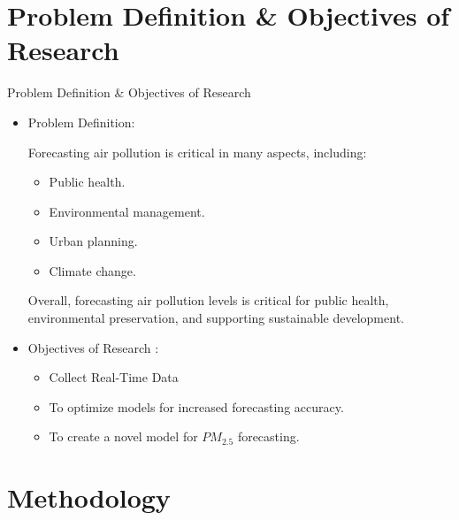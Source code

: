 \documentclass[12pt, aspectratio=169]{beamer}
\begin{document}
\section[Problem \& Objectives]{Problem Definition \& Objectives of Research}
\begin{frame}{Problem Definition \& Objectives of Research}
	\begin{itemize}
		\item Problem Definition:
		\par Forecasting air pollution is critical in many aspects, including:
		\begin{itemize}
			\item Public health.\\
			\item Environmental management. \\
			\item Urban planning.\\
			\item Climate change.\\
		\end{itemize}
		\par Overall, forecasting air pollution levels is critical for public health, environmental preservation, and supporting sustainable development.

		\item Objectives of Research :
		\begin{itemize}
			\item Collect Real-Time Data
			\item To optimize models for increased forecasting accuracy. \\
			\item To create a novel model for $PM_{2.5}$ forecasting.\\
		\end{itemize}
	\end{itemize}
\end{frame}
  

\section[Methodology]{Methodology}
\end{document}
